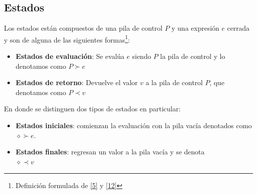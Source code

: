 \subsection{Estados}
\begin{definition} Los estados están compuestos de una pila de control $P$ y una expresión $e$ cerrada y son de alguna de las siguientes formas\footnote{Definición formulada de  \hyperlink{5}{[5]} y  \hyperlink{12}{[12]} }:
\bigskip
\begin{itemize}
    \item {\bf Estados de evaluación}: Se evalúa $e$ siendo $P$ la pila de control y lo denotamos como $P\succ e$
    \item {\bf Estados de retorno}: Devuelve el valor $v$ a la pila de control $P$, que denotamos como $P\prec v$
\end{itemize}
\bigskip
En donde se distinguen dos tipos de estados en particular:
\begin{itemize}
    \item {\bf Estados iniciales}: comienzan la evaluación con la pila vacía denotados como \\$\diamond\succ e$.
    \item {\bf Estados finales}: regresan un valor a la pila vacía y se denota\\ $\diamond\prec v$
\end{itemize}
\bigskip
\end{definition}

